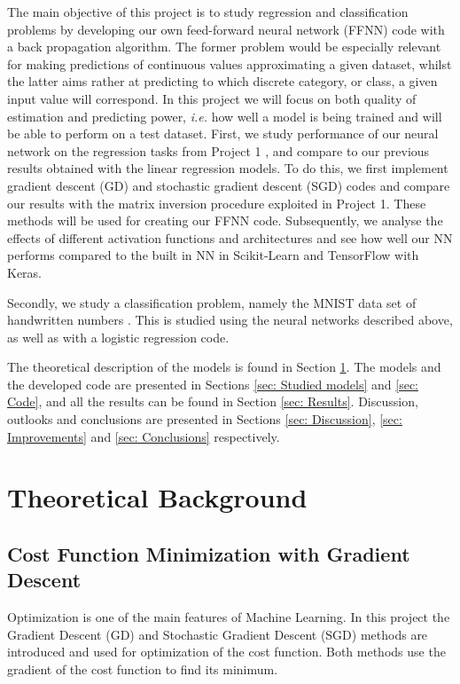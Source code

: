 \documentclass{emulateapj}
\begin{document}
The main objective of this project is to study regression and classification problems by developing our own feed-forward neural network (FFNN) code with a back propagation algorithm. The former problem would be especially relevant for making predictions of continuous values approximating a given dataset, whilst the latter aims rather at predicting to which discrete category, or class, a given input value will correspond. In this project we will focus on both quality of estimation and predicting power, \textit{i.e.} how well a model is being trained and will be able to perform on a test dataset. First, we study performance of our neural network on the regression tasks from Project 1 \cite{proj1, proj1_2}, and compare to our previous results obtained with the linear regression models. To do this, we first implement gradient descent (GD) and stochastic gradient descent (SGD) codes and compare our results with the matrix inversion procedure exploited in Project 1. These methods will be used for creating our FFNN code. Subsequently, we analyse the effects of different activation functions and architectures and see how well our NN performs compared to the built in NN in Scikit-Learn and TensorFlow with Keras.

Secondly, we study a classification problem, namely the MNIST data set of handwritten numbers \cite{MNIST}. This is studied using the neural networks described above, as well as with a logistic regression code.

The theoretical description of the models is found in Section \ref{sec: Theoretical background}. The models and the developed code are presented in Sections \ref{sec: Studied models} and \ref{sec: Code}, and all the results can be found in Section \ref{sec: Results}. Discussion, outlooks and conclusions are presented in Sections \ref{sec: Discussion}, \ref{sec: Improvements} and \ref{sec: Conclusions} respectively.


\section{Theoretical Background}
\label{sec: Theoretical background}

\subsection{Cost Function Minimization with Gradient Descent}
\label{subsec: Cost function minimization with gradient descent}
Optimization is one of the main features of Machine Learning. In this project the Gradient Descent (GD) and Stochastic Gradient Descent (SGD) methods are introduced and used for optimization of the cost function. Both methods use the gradient of the cost function to find its minimum.
\end{document}
